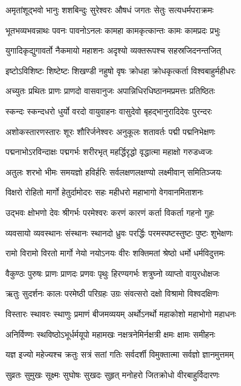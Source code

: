 \twolineshloka
{अमृतांशूद्भवो भानुः शशबिन्दुः सुरेश्वरः}
{औषधं जगतः सेतुः सत्यधर्मपराक्रमः}

\twolineshloka
{भूतभव्यभवन्नाथः पवनः पावनोऽनलः}
{कामहा कामकृत्कान्तः कामः कामप्रदः प्रभुः}

\twolineshloka
{युगादिकृद्युगावर्तो नैकमायो महाशनः}
{अदृश्यो व्यक्तरूपश्च सहस्रजिदनन्तजित्}

\twolineshloka
{इष्टोऽविशिष्टः शिष्टेष्टः शिखण्डी नहुषो वृषः}
{क्रोधहा क्रोधकृत्कर्ता विश्वबाहुर्महीधरः}

\twolineshloka
{अच्युतः प्रथितः प्राणः प्राणदो वासवानुजः}
{अपान्निधिरधिष्ठानमप्रमत्तः प्रतिष्ठितः}

\twolineshloka
{स्कन्दः स्कन्दधरो धुर्यो वरदो वायुवाहनः}
{वासुदेवो बृहद्भानुरादिदेवः पुरन्दरः}

\twolineshloka
{अशोकस्तारणस्तारः शूरः शौरिर्जनेश्वरः}
{अनुकूलः शतावर्तः पद्मी पद्मनिभेक्षणः}

\twolineshloka
{पद्मनाभोऽरविन्दाक्षः पद्मगर्भः शरीरभृत्}
{महर्द्धिरृद्धो वृद्धात्मा महाक्षो गरुडध्वजः}

\twolineshloka
{अतुलः शरभो भीमः समयज्ञो हविर्हरिः}
{सर्वलक्षणलक्षण्यो लक्ष्मीवान् समितिञ्जयः}

\twolineshloka
{विक्षरो रोहितो मार्गो हेतुर्दामोदरः सहः}
{महीधरो महाभागो वेगवानमिताशनः}

\twolineshloka
{उद्भवः क्षोभणो देवः श्रीगर्भः परमेश्वरः}
{करणं कारणं कर्ता विकर्ता गहनो गुहः}

\twolineshloka
{व्यवसायो व्यवस्थानः संस्थानः स्थानदो ध्रुवः}
{परर्द्धिः परमस्पष्टस्तुष्टः पुष्टः शुभेक्षणः}

\twolineshloka
{रामो विरामो विरतो मार्गो नेयो नयोऽनयः}
{वीरः शक्तिमतां श्रेष्ठो धर्मो धर्मविदुत्तमः}

\twolineshloka
{वैकुण्ठः पुरुषः प्राणः प्राणदः प्रणवः पृथुः}
{हिरण्यगर्भः शत्रुघ्नो व्याप्तो वायुरधोक्षजः}

\twolineshloka
{ऋतुः सुदर्शनः कालः परमेष्ठी परिग्रहः}
{उग्रः संवत्सरो दक्षो विश्रामो विश्वदक्षिणः}

\twolineshloka
{विस्तारः स्थावरः स्थाणुः प्रमाणं बीजमव्ययम्}
{अर्थोऽनर्थो महाकोशो महाभोगो महाधनः}

\twolineshloka
{अनिर्विण्णः स्थविष्ठोऽभूर्धर्मयूपो महामखः}
{नक्षत्रनेमिर्नक्षत्री क्षमः क्षामः समीहनः}

\twolineshloka
{यज्ञ इज्यो महेज्यश्च क्रतुः सत्रं सतां गतिः}
{सर्वदर्शी विमुक्तात्मा सर्वज्ञो ज्ञानमुत्तमम्}

\twolineshloka
{सुव्रतः सुमुखः सूक्ष्मः सुघोषः सुखदः सुहृत्}
{मनोहरो जितक्रोधो वीरबाहुर्विदारणः}


